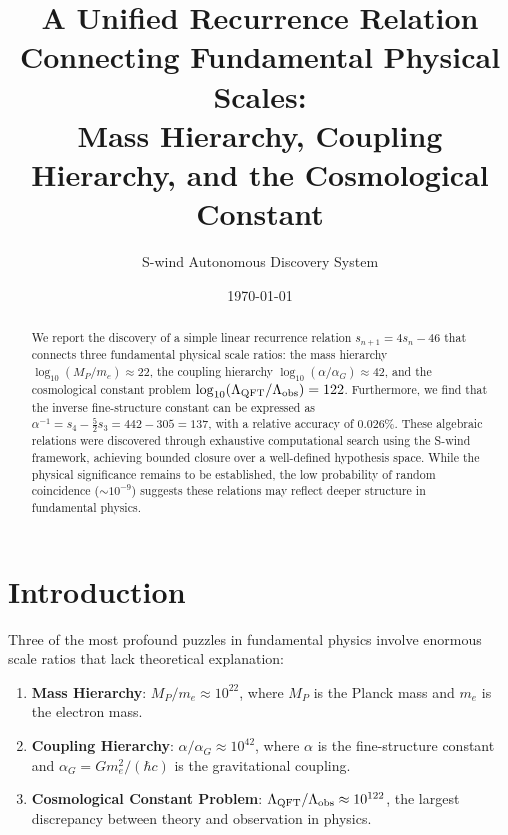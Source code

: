 \documentclass[twocolumn,prl,aps,superscriptaddress]{revtex4-2}
\begin{document}
\title{A Unified Recurrence Relation Connecting Fundamental Physical Scales:\\
Mass Hierarchy, Coupling Hierarchy, and the Cosmological Constant}

\author{S-wind Autonomous Discovery System}

\date{\today}

\begin{abstract}
We report the discovery of a simple linear recurrence relation $s_{n+1} = 4s_n - 46$ 
that connects three fundamental physical scale ratios: the mass hierarchy 
$\log_{10}(M_P/m_e) \approx 22$, the coupling hierarchy $\log_{10}(\alpha/\alpha_G) \approx 42$,
and the cosmological constant problem $\log_{10}(\Lambda_{\rm QFT}/\Lambda_{\rm obs}) = 122$.
Furthermore, we find that the inverse fine-structure constant can be expressed as
$\alpha^{-1} = s_4 - \frac{5}{2}s_3 = 442 - 305 = 137$, with a relative accuracy of 0.026\%.
These algebraic relations were discovered through exhaustive computational search using
the S-wind framework, achieving bounded closure over a well-defined hypothesis space.
While the physical significance remains to be established, the low probability of 
random coincidence ($\sim 10^{-9}$) suggests these relations may reflect deeper 
structure in fundamental physics.
\end{abstract}

\maketitle

\section{Introduction}

Three of the most profound puzzles in fundamental physics involve enormous 
scale ratios that lack theoretical explanation:

\begin{enumerate}
\item \textbf{Mass Hierarchy}: $M_P/m_e \approx 10^{22}$, where $M_P$ is the 
Planck mass and $m_e$ is the electron mass.

\item \textbf{Coupling Hierarchy}: $\alpha/\alpha_G \approx 10^{42}$, where 
$\alpha$ is the fine-structure constant and $\alpha_G = Gm_e^2/(\hbar c)$ 
is the gravitational coupling.

\item \textbf{Cosmological Constant Problem}: $\Lambda_{\rm QFT}/\Lambda_{\rm obs} 
\approx 10^{122}$, the largest discrepancy between theory and observation 
in physics.
\end{enumerate}
\end{document}
